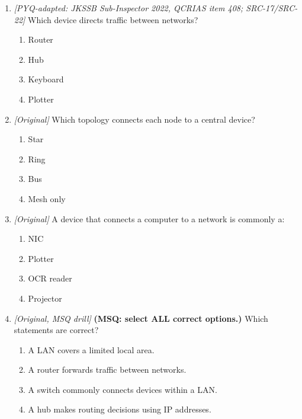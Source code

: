 \begin{enumerate}[label=\textbf{Q\arabic*.}, leftmargin=*]
\item \textit{[PYQ-adapted: JKSSB Sub-Inspector 2022, QCRIAS item 408; SRC-17/SRC-22]} Which device directs traffic between networks?
  \begin{enumerate}[label=\Alph*.]
\item Router
   \item Hub
   \item Keyboard
   \item Plotter
  \end{enumerate}

\item \textit{[Original]} Which topology connects each node to a central device?
  \begin{enumerate}[label=\Alph*.]
\item Star
   \item Ring
   \item Bus
   \item Mesh only
  \end{enumerate}

\item \textit{[Original]} A device that connects a computer to a network is commonly a:
  \begin{enumerate}[label=\Alph*.]
\item NIC
   \item Plotter
   \item OCR reader
   \item Projector
  \end{enumerate}

\item \textit{[Original, MSQ drill]} \textbf{(MSQ: select ALL correct options.)} Which statements are correct?
  \begin{enumerate}[label=\Alph*.]
\item A LAN covers a limited local area.
   \item A router forwards traffic between networks.
   \item A switch commonly connects devices within a LAN.
   \item A hub makes routing decisions using IP addresses.
  \end{enumerate}

\end{enumerate}
